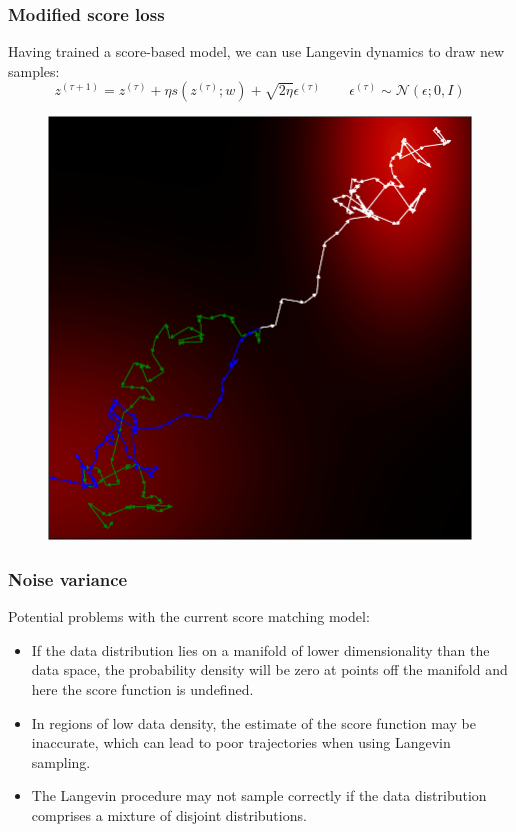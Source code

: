 \documentclass{beamer}
\begin{document}
\begin{frame}
    \frametitle{Modified score loss}
    Having trained a score-based model, we can use Langevin dynamics to draw new samples:
    \begin{equation*}
        z^{(\tau+1)}=z^{(\tau)}+\eta{}s(z^{(\tau)};w)+\sqrt{2\eta}\epsilon^{(\tau)}\qquad\epsilon^{(\tau)}\sim\mathcal{N}(\epsilon;0,I)
    \end{equation*}
    \begin{figure}
        \includegraphics[height=0.5\textheight]{Figure_6.pdf}
    \end{figure}
\end{frame}

\begin{frame}
    \frametitle{Noise variance}
    Potential problems with the current score matching model:
    \begin{itemize}
        \item If the data distribution lies on a manifold of lower dimensionality than the data space, the probability density will be zero at points off the manifold and here the score function is undefined.
        \item In regions of low data density, the estimate of the score function may be inaccurate, which can lead to poor trajectories when using Langevin sampling.
        \item The Langevin procedure may not sample correctly if the data distribution comprises a mixture of disjoint distributions.
    \end{itemize}
\end{frame}
\end{document}
